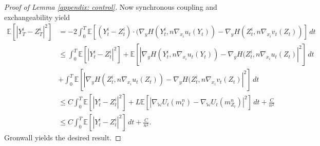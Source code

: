 \documentclass[11pt,reqno]{amsart}
\numberwithin{equation}{section}
\theoremstyle{definition}
\def\E{{\mathbb E}}
\newcommand{\wgrad}{\nabla_{\W}}
\newcommand{\W}{\mathbb W}
\begin{document}
\begin{proof}[Proof of Lemma \ref{appendix: control}]
Now synchronous coupling and exchangeability yield
\begin{align*}
    \E[|Y_T^i-Z_T^i|^2]&= -2\int_0^T \E[(Y_t^i-Z_t^i)\cdot (\nabla_y H(Y_t^i,n\nabla_{x_i} u_t(Y_t))-\nabla_y H(Z_t^i,n\nabla_{x_i} v_t(Z_t))]\,dt\\
    &\leq \int_0^T \E[|Y_t^i-Z_t^i|^2]+\E[|\nabla_y H(Y_t^i,n\nabla_{x_i} u_t(Y_t))-\nabla_y H(Z_t^i,n\nabla_{x_i} u_t(Z_t)|^2]\,dt\\
    &+\int_0^T\E[|\nabla_y H(Z_t^i,n\nabla_{x_i} u_t(Z_t))-\nabla_y H(Z_t^i,n\nabla_{x_i} v_t(Z_t)|^2]\,dt\\
    &\leq C\int_0^T \E[|Y_t^i-Z_t^i|^2]+L\E[|\wgrad U_t(m_t^n)-\wgrad U_t(m_{Z_t}^n)|^2]\,dt+ \frac{C}{n^2}\\
    &\leq C\int_0^T \E[|Y_t^i-Z_t^i|^2]\,dt+\frac{C}{n^2}.
\end{align*}
Gronwall yields the desired result.    
\end{proof}


\end{document}
